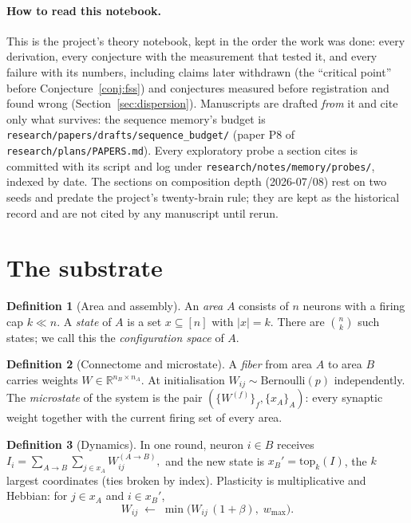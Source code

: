 \documentclass[11pt]{article}
\theoremstyle{definition}
\newtheorem{definition}{Definition}
\theoremstyle{plain}
\newcommand{\wta}{\mathrm{top}_k}
\begin{document}
\paragraph{How to read this notebook.} This is the project's theory notebook,
kept in the order the work was done: every derivation, every conjecture with
the measurement that tested it, and every failure with its numbers, including
claims later withdrawn (the ``critical point'' before
Conjecture~\ref{conj:fss}) and
conjectures measured before registration and found wrong
(Section~\ref{sec:dispersion}). Manuscripts are drafted \emph{from} it and
cite only what survives: the sequence memory's budget is
\texttt{research/papers/drafts/sequence\_budget/} (paper P8 of
\texttt{research/plans/PAPERS.md}). Every exploratory probe a section cites is
committed with its script and log under \texttt{research/notes/memory/probes/},
indexed by date. The sections on composition depth (2026-07/08) rest on two
seeds and predate the project's twenty-brain rule; they are kept as the
historical record and are not cited by any manuscript until rerun.

\section{The substrate}

\begin{definition}[Area and assembly]
An \emph{area} $A$ consists of $n$ neurons with a firing cap $k \ll n$. A
\emph{state} of $A$ is a set $x \subseteq [n]$ with $|x| = k$. There are
$\binom{n}{k}$ such states; we call this the \emph{configuration space} of $A$.
\end{definition}

\begin{definition}[Connectome and microstate]
A \emph{fiber} from area $A$ to area $B$ carries weights $W \in
\mathbb{R}^{n_B \times n_A}$. At initialisation $W_{ij} \sim
\mathrm{Bernoulli}(p)$ independently. The \emph{microstate} of the system is
the pair $(\{W^{(f)}\}_f, \{x_A\}_A)$: every synaptic weight together with the
current firing set of every area.
\end{definition}

\begin{definition}[Dynamics]
In one round, neuron $i \in B$ receives
\(
  I_i = \sum_{A \to B} \sum_{j \in x_A} W^{(A\to B)}_{ij},
\)
and the new state is $x_B' = \wta(I)$, the $k$ largest coordinates (ties broken
by index). Plasticity is multiplicative and Hebbian: for $j \in x_A$ and $i \in
x_B'$,
\[
  W_{ij} \;\longleftarrow\; \min\!\big(W_{ij}\,(1+\beta),\; w_{\max}\big).
\]
\end{definition}
\end{document}
